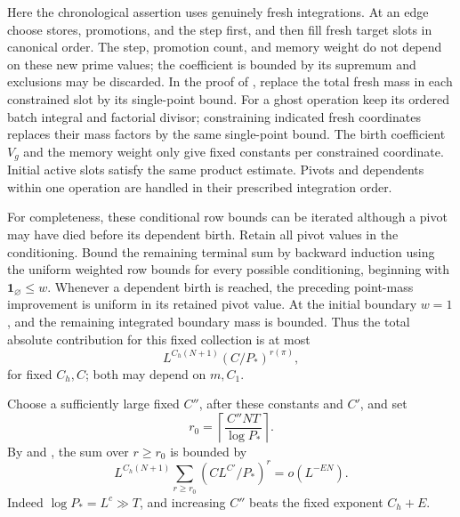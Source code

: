 Here the chronological assertion uses genuinely fresh
integrations.  At an edge choose stores, promotions,
and the step first, and then fill fresh target slots in
canonical order.  The step, promotion count, and memory
weight do not depend on these new prime values; the
coefficient is bounded by its supremum and exclusions
may be discarded.  In the proof of
, replace the total fresh mass
in each constrained slot by its single-point bound.
For a ghost operation keep its ordered batch integral
and factorial divisor; constraining indicated fresh
coordinates replaces their mass factors by the same
single-point bound.  The birth coefficient $V_g$ and
the memory weight only give fixed constants per
constrained coordinate.  Initial active slots satisfy
the same product estimate.  Pivots and dependents
within one operation are handled in their prescribed
integration order.

For completeness, these conditional row bounds can be
iterated although a pivot may have died before its
dependent birth.  Retain all pivot values in the
conditioning.  Bound the remaining terminal sum by
backward induction using the uniform weighted row
bounds for every possible conditioning, beginning
with $\mathbf1_\varnothing\le w$.  Whenever a dependent
birth is reached, the preceding point-mass improvement
is uniform in its retained pivot value.  At the initial
boundary $w=1$, and the remaining integrated boundary
mass is bounded.  Thus the total absolute contribution
for this fixed collection is at most
\begin{equation}\label{eq:high-rank-path-bound}
 L^{C_h(N+1)}(C/P_*)^{r(\pi)},
\end{equation}
for fixed $C_h,C$; both may depend on $m,C_1$.

Choose a sufficiently large fixed $C''$, after these
constants and $C'$, and set
\begin{equation}\label{eq:rank-threshold}
 r_0=\left\lceil\frac{C''NT}{\log P_*}\right\rceil.
\end{equation}
By  and
, the sum over $r\ge r_0$
is bounded by
\[
 L^{C_h(N+1)}\sum_{r\ge r_0}
               (CL^{C'}/P_*)^r=o(L^{-EN}).
\]
Indeed $\log P_*=L^c\gg T$, and increasing $C''$
beats the fixed exponent $C_h+E$.

